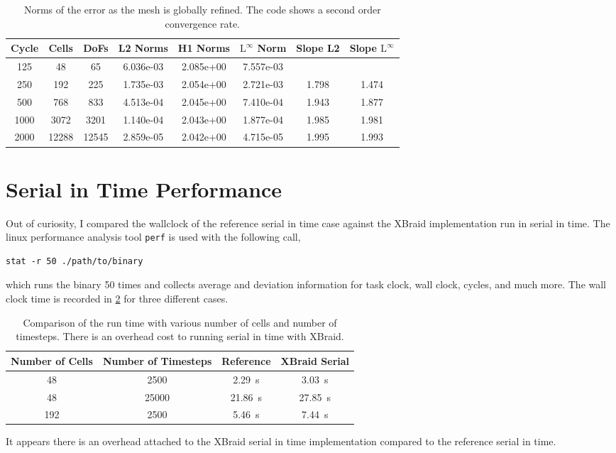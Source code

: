 \documentclass{article}
\begin{document}
\begin{table}\label{tbl:convergenceRate}
  \centering
  \begin{tabular}{c | c | c | c | c | c | c | c}
    Cycle & Cells & DoFs & L2 Norms & H1 Norms & $\textrm{L}^\infty$ Norm & Slope L2 & Slope $\textrm{L}^\infty$ \\
    \hline
    125 & 48 & 65 & 6.036e-03 & 2.085e+00 & 7.557e-03 \\
    250 & 192 & 225 & 1.735e-03 & 2.054e+00 & 2.721e-03 & 1.798 & 1.474 \\
    500 & 768 & 833 & 4.513e-04 & 2.045e+00 & 7.410e-04 & 1.943 & 1.877 \\
    1000 &  3072 & 3201 & 1.140e-04 & 2.043e+00 & 1.877e-04 & 1.985 & 1.981 \\
    2000 & 12288 & 12545 & 2.859e-05 & 2.042e+00 & 4.715e-05 & 1.995 & 1.993
  \end{tabular}
  \caption{Norms of the error as the mesh is globally refined. The code shows a
    second order convergence rate.}
\end{table}

\section{Serial in Time Performance}
\label{sec:SiTPerformance}

Out of curiosity, I compared the wallclock of the reference serial in time case
against the XBraid implementation run in serial in time.
The linux performance analysis tool \texttt{perf} is used with the following
call,
\begin{verbatim}
stat -r 50 ./path/to/binary
\end{verbatim}
which runs the binary 50 times and collects average and deviation information
for task clock, wall clock, cycles, and much more.
The wall clock time is recorded in \ref{tbl:serialPerf} for three different cases.
\begin{table}\label{tbl:serialPerf}
  \centering
  \begin{tabular}{c | c | c | c}
    Number of Cells & Number of Timesteps & Reference & XBraid Serial \\
    \hline
    48 & 2500 & \SI{2.29}{\second} & \SI{3.03}{\second} \\
    48 & 25000 & \SI{21.86}{\second} & \SI{27.85}{\second} \\
    192 & 2500 & \SI{5.46}{\second} & \SI{7.44}{\second} \\
  \end{tabular}
  \caption{Comparison of the run time with various number of cells and number of
  timesteps. There is an overhead cost to running serial in time with XBraid.}
\end{table}

It appears there is an overhead attached to the XBraid serial in time implementation compared
to the reference serial in time.
\end{document}
